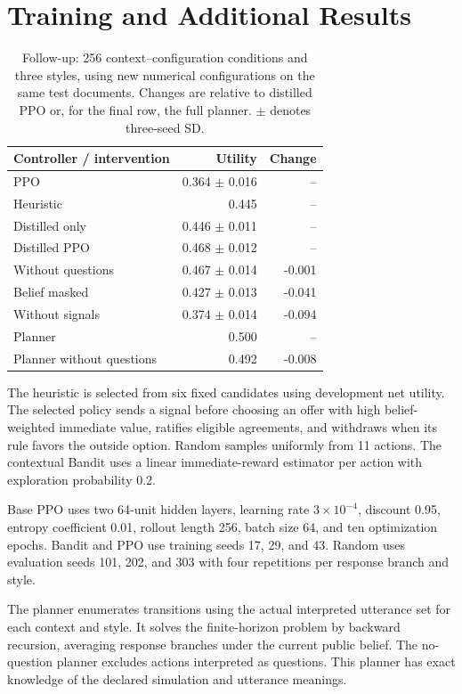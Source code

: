 \section{Training and Additional Results}
\label{app:training}

\begin{table}[t]
\centering\small
\setlength{\tabcolsep}{3pt}
\begin{tabular}{lrr}
\toprule
Controller / intervention & Utility & Change \\
\midrule
PPO & 0.364 $\pm$ 0.016 & -- \\
Heuristic & 0.445 & -- \\
Distilled only & 0.446 $\pm$ 0.011 & -- \\
Distilled PPO & 0.468 $\pm$ 0.012 & -- \\
Without questions & 0.467 $\pm$ 0.014 & -0.001 \\
Belief masked & 0.427 $\pm$ 0.013 & -0.041 \\
Without signals & 0.374 $\pm$ 0.014 & -0.094 \\
Planner & 0.500 & -- \\
Planner without questions & 0.492 & -0.008 \\
\bottomrule
\end{tabular}
\caption{Follow-up: 256 context--configuration conditions and three styles, using new numerical configurations on the same test documents. Changes are relative to distilled PPO or, for the final row, the full planner. $\pm$ denotes three-seed SD.}
\label{tab:interventions}
\end{table}
The heuristic is selected from six fixed candidates using development net utility. The selected policy sends a signal before choosing an offer with high belief-weighted immediate value, ratifies eligible agreements, and withdraws when its rule favors the outside option. Random samples uniformly from 11 actions. The contextual Bandit uses a linear immediate-reward estimator per action with exploration probability 0.2.

Base PPO uses two 64-unit hidden layers, learning rate $3\times10^{-4}$, discount 0.95, entropy coefficient 0.01, rollout length 256, batch size 64, and ten optimization epochs. Bandit and PPO use training seeds 17, 29, and 43. Random uses evaluation seeds 101, 202, and 303 with four repetitions per response branch and style.

The planner enumerates transitions using the actual interpreted utterance set for each context and style. It solves the finite-horizon problem by backward recursion, averaging response branches under the current public belief. The no-question planner excludes actions interpreted as questions. This planner has exact knowledge of the declared simulation and utterance meanings.

